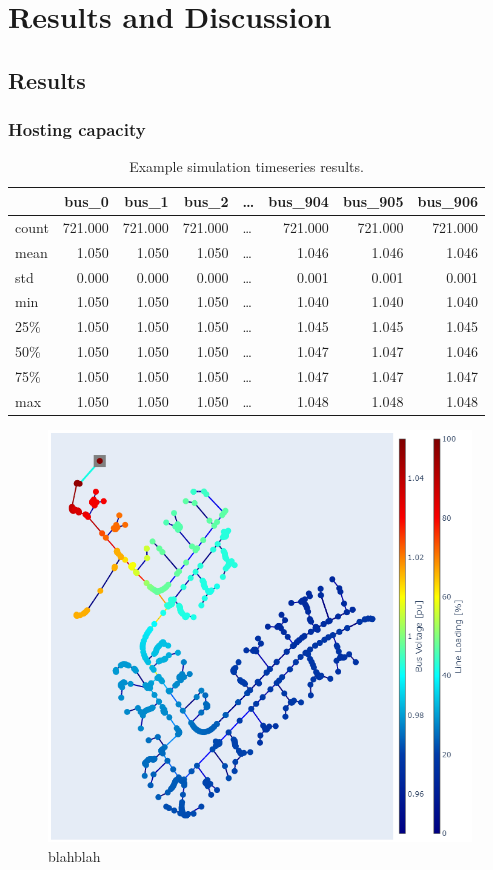 \documentclass[a4paper,10pt]{report}
\begin{document}
\chapter{Results and Discussion}
\section{Results}
\subsection{Hosting capacity}

\begin{table}[htpb]
	\centering
	\begin{tabular}{lrrrlrrr}
		\toprule
		& bus\_0 & bus\_1 & bus\_2 & \dots & bus\_904 & bus\_905 & bus\_906 \\
		\midrule
		count & 721.000 & 721.000 & 721.000 & \dots & 721.000 & 721.000 & 721.000 \\
		mean & 1.050 & 1.050 & 1.050 & \dots & 1.046 & 1.046 & 1.046 \\
		std & 0.000 & 0.000 & 0.000 & \dots & 0.001 & 0.001 & 0.001 \\
		min & 1.050 & 1.050 & 1.050 & \dots & 1.040 & 1.040 & 1.040 \\
		25\% & 1.050 & 1.050 & 1.050 & \dots & 1.045 & 1.045 & 1.045 \\
		50\% & 1.050 & 1.050 & 1.050 & \dots & 1.047 & 1.047 & 1.046 \\
		75\% & 1.050 & 1.050 & 1.050 & \dots & 1.047 & 1.047 & 1.047 \\
		max & 1.050 & 1.050 & 1.050 & \dots & 1.048 & 1.048 & 1.048 \\
		\bottomrule
	\end{tabular}
	\caption{Example simulation timeseries results.}
\end{table}

\FloatBarrier
\begin{figure}[htpb]
	\centering
	\includegraphics[width=0.9\linewidth]{EU_LV_host_capacity}
	\caption{blahblah}
	\label{EU_LV_host_capacity}
\end{figure}
\FloatBarrier
\end{document}

